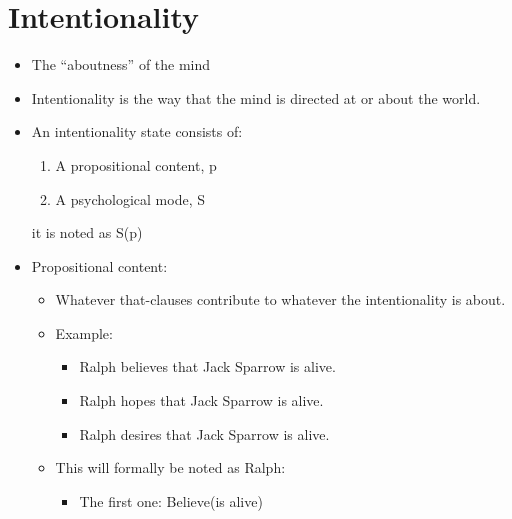 \section{Intentionality}
\begin{itemize}
    \item The ``aboutness'' of the mind 
    \item Intentionality is the way that the mind is directed at or about the world.
    \item An intentionality state consists of:
        \begin{enumerate}
            \item A propositional content, p
            \item A psychological mode, S
        \end{enumerate}
        it is noted as S(p)
    
    \item Propositional content: 
        \begin{itemize}
            \item Whatever that-clauses contribute to whatever the intentionality is about.
            \item Example:
                \begin{itemize}
                    \item Ralph believes that Jack Sparrow is alive.
                    \item Ralph hopes that Jack Sparrow is alive.
                    \item Ralph desires that Jack Sparrow is alive.
                \end{itemize}
            
            \item This will formally be noted as Ralph: 
                \begin{itemize}
                    \item The first one: Believe(is alive)
                \end{itemize}
        \end{itemize}
    

\end{itemize}
